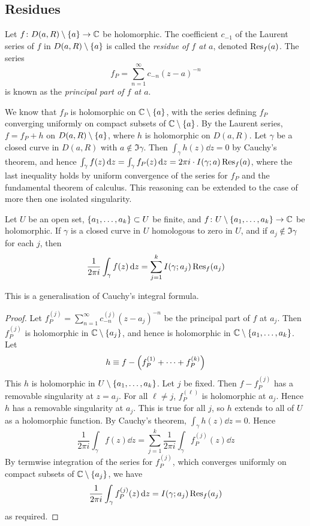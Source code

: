\subsection{Residues}
\begin{definition}
	Let \( f \colon D(a,R) \setminus \qty{a} \to \mathbb C \) be holomorphic.
	The coefficient \( c_{-1} \) of the Laurent series of \( f \) in \( D(a,R) \setminus \qty{a} \) is called the \textit{residue of \( f \) at \( a \)}, denoted \( \Res_f(a) \).
	The series
	\[
		f_P = \sum_{n=1}^\infty c_{-n} (z-a)^{-n}
	\]
	is known as the \textit{principal part of \( f \) at \( a \)}.
\end{definition}
We know that \( f_P \) is holomorphic on \( \mathbb C \setminus \qty{a} \), with the series defining \( f_P \) converging uniformly on compact subsets of \( \mathbb C \setminus \qty{a} \).
By the Laurent series, \( f = f_P + h \) on \( D(a,R) \setminus \qty{a} \), where \( h \) is holomorphic on \( D(a,R) \).
Let \( \gamma \) be a closed curve in \( D(a,R) \) with \( a \not\in \Im \gamma \).
Then \( \int_\gamma h(z) \dd{z} = 0 \) by Cauchy's theorem, and hence \( \int_\gamma f(z) \dd{z} = \int_\gamma f_P(z) \dd{z} = 2\pi i \cdot I(\gamma;a) \Res_f(a) \), where the last inequality holds by uniform convergence of the series for \( f_P \) and the fundamental theorem of calculus.
This reasoning can be extended to the case of more then one isolated singularity.
\begin{theorem}
	Let \( U \) be an open set, \( \qty{a_1, \dots, a_k} \subset U \) be finite, and \( f \colon U \setminus \qty{a_1, \dots, a_k} \to \mathbb C \) be holomorphic.
	If \( \gamma \) is a closed curve in \( U \) homologous to zero in \( U \), and if \( a_j \not\in \Im \gamma \) for each \( j \), then
	\[
		\frac{1}{2\pi i} \int_\gamma f(z) \dd{z} = \sum_{j=1}^k I(\gamma;a_j) \Res_f(a_j)
	\]
\end{theorem}
This is a generalisation of Cauchy's integral formula.
\begin{proof}
	Let \( f_P^{(j)} = \sum_{n=1}^\infty c_{-n}^{(j)} (z-a_j)^{-n} \) be the principal part of \( f \) at \( a_j \).
	Then \( f_P^{(j)} \) is holomorphic in \( \mathbb C \setminus \qty{a_j} \), and hence is holomorphic in \( \mathbb C \setminus \qty{a_1, \dots, a_k} \).
	Let
	\[
		h \equiv f - \qty(f_P^{(1)} + \dots + f_P^{(k)})
	\]
	This \( h \) is holomorphic in \( U \setminus \qty{a_1, \dots, a_k} \).
	Let \( j \) be fixed.
	Then \( f - f_P^{(j)} \) has a removable singularity at \( z = a_j \).
	For all \( \ell \neq j \), \( f_P^{(\ell)} \) is holomorphic at \( a_j \).
	Hence \( h \) has a removable singularity at \( a_j \).
	This is true for all \( j \), so \( h \) extends to all of \( U \) as a holomorphic function.
	By Cauchy's theorem, \( \int_\gamma h(z) \dd{z} = 0 \).
	Hence
	\[
		\frac{1}{2\pi i} \int_\gamma f(z) \dd{z} = \sum_{j=1}^k \frac{1}{2\pi i} \int_\gamma f_P^{(j)}(z) \dd{z}
	\]
	By termwise integration of the series for \( f_P^{(j)} \), which converges uniformly on compact subsets of \( \mathbb C \setminus \qty{a_j} \), we have
	\[
		\frac{1}{2\pi i} \int_\gamma f_P^{(j)}(z) \dd{z} = I(\gamma;a_j) \Res_f(a_j)
	\]
	as required.
\end{proof}
